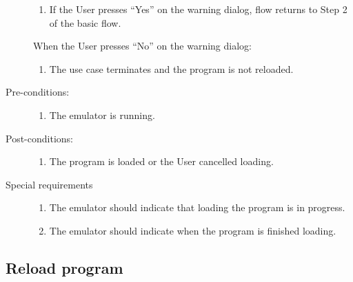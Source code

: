 \documentclass[12pt]{article}
\begin{document}
\begin{description}
\begin{enumerate}
			\item{If the User presses ``Yes'' on the warning dialog, flow returns to Step 2 of the basic flow.}
		\end{enumerate}
	When the User presses ``No'' on the warning dialog:
        \begin{enumerate}
          \item{The use case terminates and the program is not reloaded.}
        \end{enumerate}
      \item[Pre-conditions:] \hfill
        \begin{enumerate}
          \item{The emulator is running.}
        \end{enumerate}
      \item[Post-conditions:] \hfill
        \begin{enumerate}
	  \item{The program is loaded or the User cancelled loading.}
        \end{enumerate}
      \item[Special requirements] \hfill
        \begin{enumerate}
          \item{The emulator should indicate that loading the program is in progress.}
          \item{The emulator should indicate when the program is finished loading.}
        \end{enumerate}
    \end{description}
  \subsection{Reload program}
\end{document}
